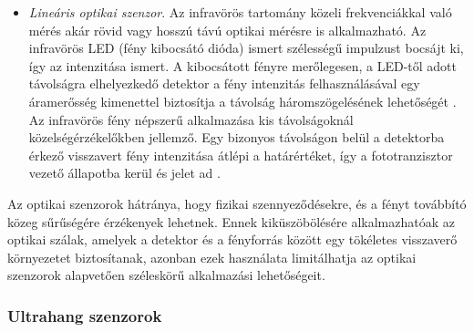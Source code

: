 \begin{itemize}
	\item \textit{Lineáris optikai szenzor}. Az infravörös tartomány közeli frekvenciákkal való mérés akár rövid vagy hosszú távú optikai mérésre is alkalmazható. Az infravörös LED (fény kibocsátó dióda) ismert szélességű impulzust bocsájt ki, így az intenzitása ismert. A kibocsátott fényre merőlegesen, a LED-től adott távolságra elhelyezkedő detektor a fény intenzitás felhasználásával egy áramerősség kimenettel biztosítja a távolság háromszögelésének lehetőségét \cite{Fraden2016a}. Az infravörös fény népszerű alkalmazása kis távolságoknál közelségérzékelőkben jellemző. Egy bizonyos távolságon belül a detektorba érkező visszavert fény intenzitása átlépi a határértéket, így a fototranzisztor vezető állapotba kerül és jelet ad \cite{Morris2016c}.
\end{itemize}
Az optikai szenzorok hátránya, hogy fizikai szennyeződésekre, és a fényt továbbító közeg sűrűségére érzékenyek lehetnek. Ennek kiküszöbölésére alkalmazhatóak az optikai szálak, amelyek a detektor és a fényforrás között egy tökéletes visszaverő környezetet biztosítanak, azonban ezek használata limitálhatja az optikai szenzorok alapvetően széleskörű alkalmazási lehetőségeit.

\subsubsection{Ultrahang szenzorok}

